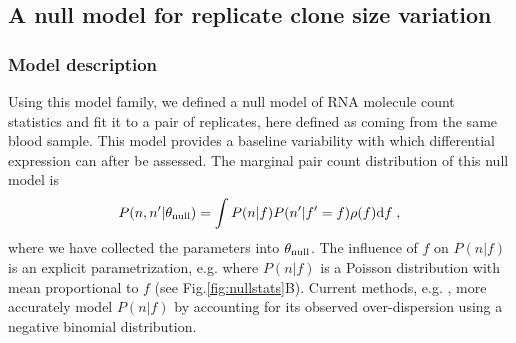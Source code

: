 \documentclass[letterpaper,english,prl,reprint,longbibliography]{revtex4-1} %
\begin{document}

\subsection*{A null model for replicate clone size variation}

\subsubsection*{Model description}
Using this model family, we defined a null model of RNA molecule count statistics and fit it to a pair of replicates, here defined as coming from the same blood sample. 
This model provides a baseline variability with which differential expression can after be assessed. 
The marginal pair count distribution of this null model is  
\begin{eqnarray}
	P(n,n'|\theta_{\textrm{\textrm{null}}})=\int P(n|f)P(n'|f'=f)\rho(f)\text{d}f\;,
\end{eqnarray}
where we have collected the parameters into $\theta_{\textrm{\textrm{null}}}$. 
The influence of $f$ on $P(n|f)$ is an explicit parametrization, e.g. where $P(n|f)$ is a Poisson distribution with mean proportional to $f$ (see Fig.\ref{fig:nullstats}B). 
Current methods, e.g. \cite{Robinson2008}, more accurately model $P(n|f)$ by accounting for its observed over-dispersion using a negative binomial distribution. 
\end{document}
